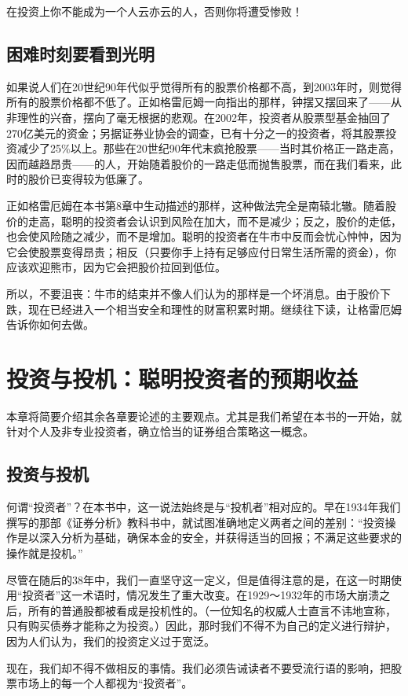 \documentclass[12pt,oneside]{book}
\begin{document}
在投资上你不能成为一个人云亦云的人，否则你将遭受惨败！



\subsection{困难时刻要看到光明}
如果说人们在20世纪90年代似乎觉得所有的股票价格都不高，到2003年时，则觉得所有的股票价格都不低了。正如格雷厄姆一向指出的那样，钟摆又摆回来了——从非理性的兴奋，摆向了毫无根据的悲观。在2002年，投资者从股票型基金抽回了270亿美元的资金；另据证券业协会的调查，已有十分之一的投资者，将其股票投资减少了25\%以上。那些在20世纪90年代末疯抢股票——当时其价格正一路走高，因而越趋昂贵——的人，开始随着股价的一路走低而抛售股票，而在我们看来，此时的股价已变得较为低廉了。

正如格雷厄姆在本书第8章中生动描述的那样，这种做法完全是南辕北辙。随着股价的走高，聪明的投资者会认识到风险在加大，而不是减少；反之，股价的走低，也会使风险随之减少，而不是增加。聪明的投资者在牛市中反而会忧心忡忡，因为它会使股票变得昂贵；相反（只要你手上持有足够应付日常生活所需的资金），你应该欢迎熊市，因为它会把股价拉回到低位。

所以，不要沮丧：牛市的结束并不像人们认为的那样是一个坏消息。由于股价下跌，现在已经进入一个相当安全和理性的财富积累时期。继续往下读，让格雷厄姆告诉你如何去做。


\section{投资与投机：聪明投资者的预期收益}
本章将简要介绍其余各章要论述的主要观点。尤其是我们希望在本书的一开始，就针对个人及非专业投资者，确立恰当的证券组合策略这一概念。

\subsection{投资与投机}
何谓“投资者”？在本书中，这一说法始终是与“投机者”相对应的。早在1934年我们撰写的那部《证券分析》教科书中，就试图准确地定义两者之间的差别：“投资操作是以深入分析为基础，确保本金的安全，并获得适当的回报；不满足这些要求的操作就是投机。”

尽管在随后的38年中，我们一直坚守这一定义，但是值得注意的是，在这一时期使用“投资者”这一术语时，情况发生了重大改变。在1929～1932年的市场大崩溃之后，所有的普通股都被看成是投机性的。（一位知名的权威人士直言不讳地宣称，只有购买债券才能称之为投资。）因此，那时我们不得不为自己的定义进行辩护，因为人们认为，我们的投资定义过于宽泛。

现在，我们却不得不做相反的事情。我们必须告诫读者不要受流行语的影响，把股票市场上的每一个人都视为“投资者”。
\end{document}
